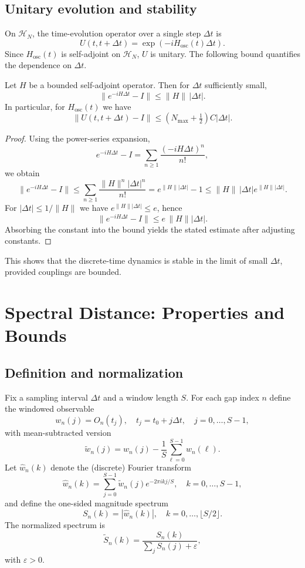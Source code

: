 \documentclass[11pt]{article}
\begin{document}
\subsection{Unitary evolution and stability}

On $\mathcal{H}_N$, the time-evolution operator over a single step $\Delta t$ is
\[
U(t,t+\Delta t) = \exp(-i H_{\text{osc}}(t)\Delta t).
\]
Since $H_{\text{osc}}(t)$ is self-adjoint on $\mathcal{H}_N$, $U$ is unitary. The following bound quantifies the dependence on $\Delta t$.

\begin{lemma}
Let $H$ be a bounded self-adjoint operator. Then for $\Delta t$ sufficiently small,
\[
\| e^{-iH\Delta t} - I \| \le \|H\|\,|\Delta t|.
\]
In particular, for $H_{\text{osc}}(t)$ we have
\[
\| U(t,t+\Delta t) - I \| \le \left(N_{\max} + \tfrac12\right) C |\Delta t|.
\]
\end{lemma}

\begin{proof}
Using the power-series expansion,
\[
e^{-iH\Delta t} - I = \sum_{n\ge 1} \frac{(-iH\Delta t)^n}{n!},
\]
we obtain
\[
\| e^{-iH\Delta t} - I \| \le \sum_{n\ge 1} \frac{\|H\|^n |\Delta t|^n}{n!} 
= e^{\|H\||\Delta t|} - 1 \le \|H\|\,|\Delta t| e^{\|H\||\Delta t|}.
\]
For $|\Delta t|\le 1/\|H\|$ we have $e^{\|H\||\Delta t|}\le e$, hence
\[
\| e^{-iH\Delta t} - I \| \le e\,\|H\||\Delta t|.
\]
Absorbing the constant into the bound yields the stated estimate after adjusting constants.
\end{proof}

This shows that the discrete-time dynamics is stable in the limit of small $\Delta t$, provided couplings are bounded.

\section{Spectral Distance: Properties and Bounds}

\subsection{Definition and normalization}

Fix a sampling interval $\Delta t$ and a window length $S$. For each gap index $n$ define the windowed observable
\[
w_n(j) = O_n(t_j), \quad t_j = t_0 + j \Delta t,\quad j=0,\dots,S-1,
\]
with mean-subtracted version
\[
\tilde{w}_n(j) = w_n(j) - \frac{1}{S}\sum_{\ell=0}^{S-1} w_n(\ell).
\]
Let $\hat{w}_n(k)$ denote the (discrete) Fourier transform
\[
\hat{w}_n(k) = \sum_{j=0}^{S-1} \tilde{w}_n(j) e^{-2\pi i k j / S}, \quad k = 0,\dots,S-1,
\]
and define the one-sided magnitude spectrum
\[
S_n(k) = |\hat{w}_n(k)|,\quad k = 0,\dots,\lfloor S/2\rfloor.
\]
The normalized spectrum is
\[
\tilde{S}_n(k) = \frac{S_n(k)}{\sum_{j} S_n(j) + \varepsilon},
\]
with $\varepsilon>0$.
\end{document}
